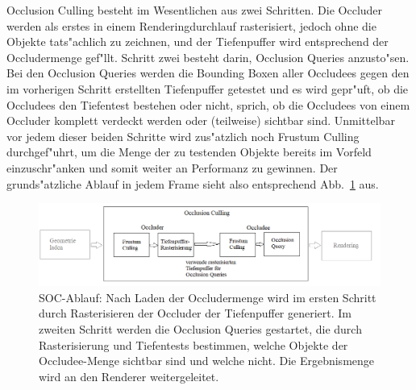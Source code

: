 \documentclass[journal]{vgtc}
\begin{document}
Occlusion Culling besteht im Wesentlichen aus zwei Schritten.
Die Occluder werden als erstes in einem Renderingdurchlauf rasterisiert, jedoch ohne die Objekte tats"achlich zu zeichnen, und der Tiefenpuffer wird entsprechend der Occludermenge gef"llt.
Schritt zwei besteht darin, Occlusion Queries anzusto"sen.
Bei den Occlusion Queries werden die Bounding Boxen aller Occludees gegen den im vorherigen Schritt erstellten Tiefenpuffer getestet und es wird gepr"uft, ob die Occludees den Tiefentest bestehen oder nicht, sprich, ob die Occludees von einem Occluder komplett verdeckt werden oder (teilweise) sichtbar sind.
Unmittelbar vor jedem dieser beiden Schritte wird zus"atzlich noch Frustum Culling durchgef"uhrt, um die Menge der zu testenden Objekte bereits im Vorfeld einzuschr"anken und somit weiter an Performanz zu gewinnen.
Der grunds"atzliche Ablauf in jedem Frame sieht also entsprechend Abb.\ \ref{fig:socablauf} aus.
\begin{figure}%
\includegraphics[width=\columnwidth]{images/SOCAblauf3.png}%
\caption{SOC-Ablauf: Nach Laden der Occludermenge wird im ersten Schritt durch Rasterisieren der Occluder der Tiefenpuffer generiert. Im zweiten Schritt werden die Occlusion Queries gestartet, die durch Rasterisierung und Tiefentests bestimmen, welche Objekte der Occludee-Menge sichtbar sind und welche nicht. Die Ergebnismenge wird an den Renderer weitergeleitet.}%
\label{fig:socablauf}%
\end{figure}
\end{document}
